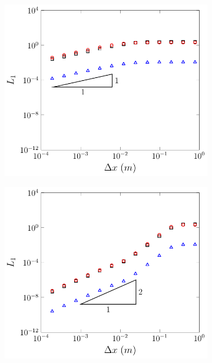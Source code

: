 \begin{figure}
	\centering
	\begin{subfigure}{0.5\textwidth}
		\includegraphics[width=\textwidth]{./chp5/figures/Analytic/Soliton/L1/FDVM1.pdf}
		\vspace{0.5cm}
	\end{subfigure}%
	\begin{subfigure}{0.5\textwidth}
		\includegraphics[width=\textwidth]{./chp5/figures/Analytic/Soliton/L1/FDVM2.pdf}

\end{subfigure}
\end{figure}
